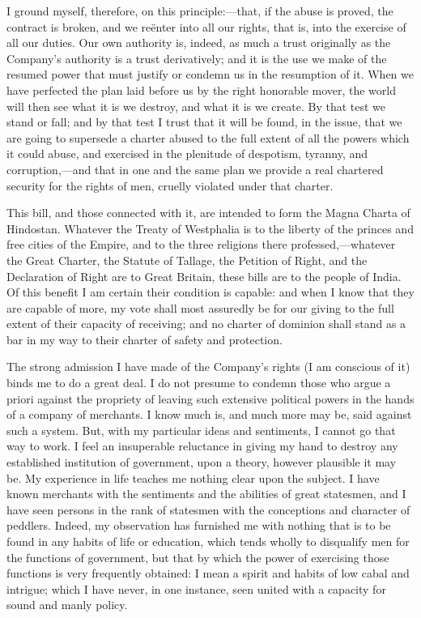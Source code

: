 I ground myself, therefore, on this principle:—that, if the abuse is proved, the contract is broken, and we reënter into all our rights, that is, into the exercise of all our duties. Our own authority is, indeed, as much a trust originally as the Company's authority is a trust derivatively; and it is the use we make of the resumed power that must justify or condemn us in the resumption of it. When we have perfected the plan laid before us by the right honorable mover, the world will then see what it is we destroy, and what it is we create. By that test we stand or fall; and by that test I trust that it will be found, in the issue, that we are going to supersede a charter abused to the full extent of all the powers which it could abuse, and exercised in the plenitude of despotism, tyranny, and corruption,—and that in one and the same plan we provide a real chartered security for the rights of men, cruelly violated under that charter.

This bill, and those connected with it, are intended to form the Magna Charta of Hindostan. Whatever the Treaty of Westphalia is to the liberty of the princes and free cities of the Empire, and to the three religions there professed,—whatever the Great Charter, the Statute of Tallage, the Petition of Right, and the Declaration of Right are to Great Britain, these bills are to the people of India. Of this benefit I am certain their condition is capable: and when I know that they are capable of more, my vote shall most assuredly be for our giving to the full extent of their capacity of receiving; and no charter of dominion shall stand as a bar in my way to their charter of safety and protection.

The strong admission I have made of the Company's rights (I am conscious of it) binds me to do a great deal. I do not presume to condemn those who argue a priori against the propriety of leaving such extensive political powers in the hands of a company of merchants. I know much is, and much more may be, said against such a system. But, with my particular ideas and sentiments, I cannot go that way to work. I feel an insuperable reluctance in giving my hand to destroy any established institution of government, upon a theory, however plausible it may be. My experience in life teaches me nothing clear upon the subject. I have known merchants with the sentiments and the abilities of great statesmen, and I have seen persons in the rank of statesmen with the conceptions and character of peddlers. Indeed, my observation has furnished me with nothing that is to be found in any habits of life or education, which tends wholly to disqualify men for the functions of government, but that by which the power of exercising those functions is very frequently obtained: I mean a spirit and habits of low cabal and intrigue; which I have never, in one instance, seen united with a capacity for sound and manly policy.

